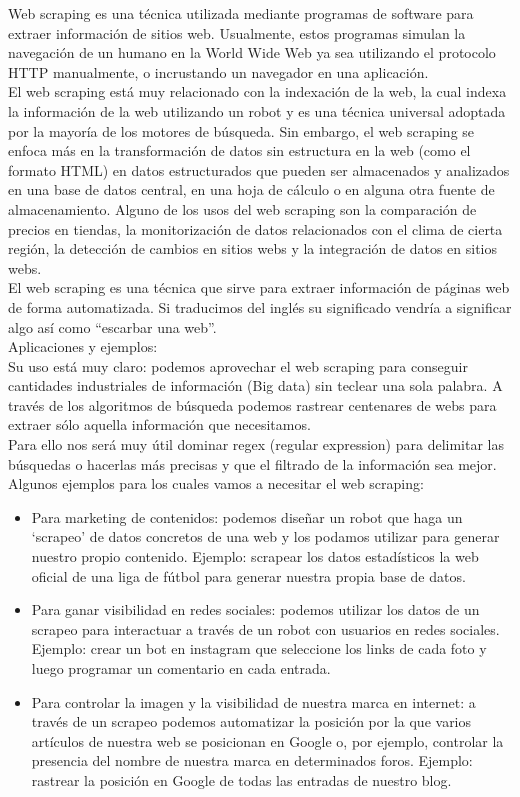 \begin{itemize}
			Web scraping es una técnica utilizada mediante programas de software para extraer información de sitios web. Usualmente, estos programas simulan la navegación de un humano en la World Wide Web ya sea utilizando el protocolo HTTP manualmente, o incrustando un navegador en una aplicación.  \\
			El web scraping está muy relacionado con la indexación de la web, la cual indexa la información de la web utilizando un robot y es una técnica universal adoptada por la mayoría de los motores de búsqueda. Sin embargo, el web scraping se enfoca más en la transformación de datos sin estructura en la web (como el formato HTML) en datos estructurados que pueden ser almacenados y analizados en una base de datos central, en una hoja de cálculo o en alguna otra fuente de almacenamiento. Alguno de los usos del web scraping son la comparación de precios en tiendas, la monitorización de datos relacionados con el clima de cierta región, la detección de cambios en sitios webs y la integración de datos en sitios webs.	\cite{araña} \\
			
			El web scraping es una técnica que sirve para extraer información de páginas web de forma automatizada. Si traducimos del inglés su significado vendría a significar algo así como “escarbar una web”. \\
			Aplicaciones y ejemplos:\\
			Su uso está muy claro: podemos aprovechar el web scraping para conseguir cantidades industriales de información (Big data) sin teclear una sola palabra. A través de los algoritmos de búsqueda podemos rastrear centenares de webs para extraer sólo aquella información que necesitamos.\\
			Para ello nos será muy útil dominar regex (regular expression) para delimitar las búsquedas o hacerlas más precisas y que el filtrado de la información sea mejor.\\
			Algunos ejemplos para los cuales vamos a necesitar el web scraping:
				\begin{itemize}
					\item Para marketing de contenidos: podemos diseñar un robot que haga un ‘scrapeo’ de datos concretos de una web y los podamos utilizar para generar nuestro propio contenido. Ejemplo: scrapear los datos estadísticos la web oficial de una liga de fútbol para generar nuestra propia base de datos.
					\item Para ganar visibilidad en redes sociales: podemos utilizar los datos de un scrapeo para interactuar a través de un robot con usuarios en redes sociales. Ejemplo: crear un bot en instagram que seleccione los links de cada foto y luego programar un comentario en cada entrada.
					\item Para controlar la imagen y la visibilidad de nuestra marca en internet: a través de un scrapeo podemos automatizar la posición por la que varios artículos de nuestra web se posicionan en Google o, por ejemplo, controlar la presencia del nombre de nuestra marca en determinados foros. Ejemplo: rastrear la posición en Google de todas las entradas de nuestro blog.
				\end{itemize}	


\end{itemize}

